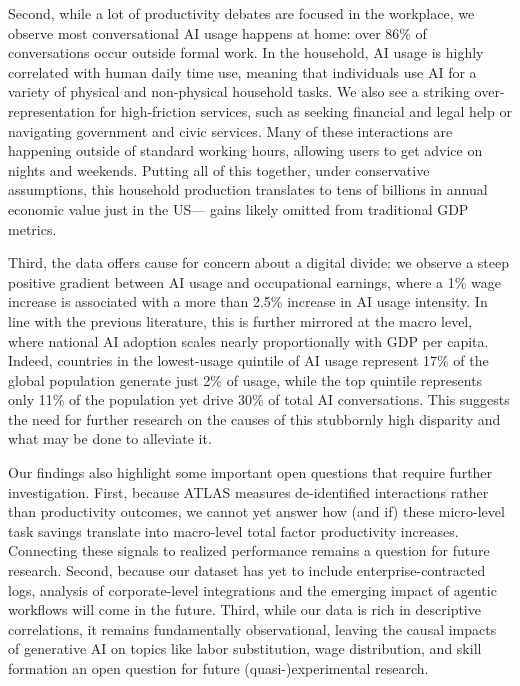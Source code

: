 \documentclass[11pt,a4paper]{article}
\begin{document}
Second, while a lot of productivity debates are focused in the workplace, we observe most conversational AI usage happens at home: over 86\% of conversations occur outside formal work. In the household, AI usage is highly correlated with human daily time use, meaning that individuals use AI for a variety of physical and non-physical household tasks. We also see a striking over-representation for high-friction services, such as seeking financial and legal help or navigating government and civic services. Many of these interactions are happening outside of standard working hours, allowing users to get advice on nights and weekends. Putting all of this together, under conservative assumptions, this household production translates to tens of billions in annual economic value just in the US— gains likely omitted from traditional GDP metrics.

Third, the data offers cause for concern about a digital divide: we observe a steep positive gradient between AI usage and occupational earnings, where a 1\% wage increase is associated with a more than 2.5\% increase in AI usage intensity. In line with the previous literature, this is further mirrored at the macro level, where national AI adoption scales nearly proportionally with GDP per capita. Indeed, countries in the lowest-usage quintile of AI usage represent 17\% of the global population generate just 2\% of usage, while the top quintile represents only 11\% of the population yet drive 30\% of total AI conversations. This suggests the need for further research on the causes of this stubbornly high disparity and what may be done to alleviate it.

Our findings also highlight some important open questions that require further investigation. First, because ATLAS measures de-identified interactions rather than productivity outcomes, we cannot yet answer how (and if) these micro-level task savings translate into macro-level total factor productivity increases. Connecting these signals to realized performance remains a question for future research. Second, because our dataset has yet to include enterprise-contracted logs, analysis of corporate-level integrations and the emerging impact of agentic workflows will come in the future. Third, while our data is rich in descriptive correlations, it remains fundamentally observational, leaving the causal impacts of generative AI on topics like labor substitution, wage distribution, and skill formation an open question for future (quasi-)experimental research.
\end{document}
